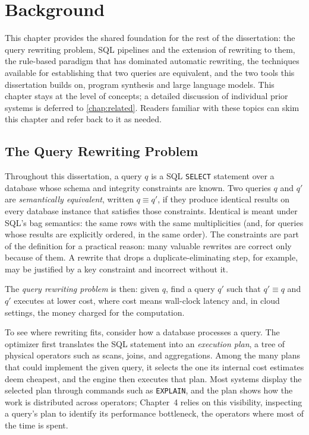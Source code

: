 \chapter{Background}
\label{chap:background}

This chapter provides the shared foundation for the rest of the
dissertation: the query rewriting problem, SQL pipelines and the
extension of rewriting to them, the rule-based paradigm that has
dominated automatic rewriting, the techniques available for
establishing that two queries are equivalent, and the two tools this
dissertation builds on, program synthesis and large language models.
This chapter stays at the level of concepts; a detailed discussion of
individual prior systems is deferred to \cref{chap:related}. Readers
familiar with these topics can skim this chapter and refer back to it
as needed.

\section{The Query Rewriting Problem}
\label{sec:bg:problem}

Throughout this dissertation, a query $q$ is a SQL \texttt{SELECT}
statement over a database whose schema and integrity constraints are
known. Two queries $q$ and $q'$ are \emph{semantically equivalent},
written $q \equiv q'$, if they produce identical results on every
database instance that satisfies those constraints. Identical is meant
under SQL's bag semantics: the same rows with the same multiplicities
(and, for queries whose results are explicitly ordered, in the same
order). The constraints are part of the definition for a practical
reason: many valuable rewrites are correct only because of them. A
rewrite that drops a duplicate-eliminating step, for example, may be
justified by a key constraint and incorrect without it.

The \emph{query rewriting problem} is then: given $q$, find a query
$q'$ such that $q' \equiv q$ and $q'$ executes at lower cost, where
cost means wall-clock latency and, in cloud settings, the money
charged for the computation.

To see where rewriting fits, consider how a database processes a
query. The optimizer first translates the SQL statement into an
\emph{execution plan}, a tree of physical operators such as scans,
joins, and aggregations. Among the many plans that could implement
the given query, it selects the one its internal cost estimates deem
cheapest, and the engine then executes that plan. Most systems
display the selected plan through commands such as \texttt{EXPLAIN},
and the plan shows how the work is distributed across operators;
Chapter~4 relies on this visibility, inspecting a query's plan to
identify its performance bottleneck, the operators where most of the
time is spent.

